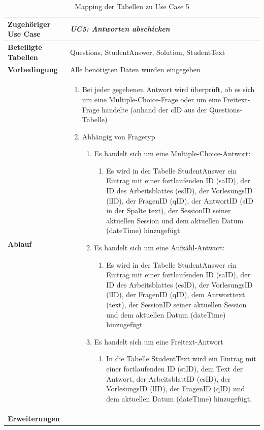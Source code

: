 \begin{table}[h]
	\begin{tabular}{|p{3cm}|p{11.06cm}|}
	\hline
		\textbf{Zugehöriger Use Case}                 &     \emph{UC5: Antworten abschicken} \prettyref{uc:UC5}    \\ \hline
		\textbf{Beteiligte Tabellen}      &     Questions, StudentAnswer, Solution, StudentText    \\ \hline
		\textbf{Vorbedingung}              &    Alle benötigten Daten wurden eingegeben     \\ \hline
		\textbf{Ablauf}              &   
			\begin{enumerate}
			  \item Bei jeder gegebenen Antwort wird überprüft, ob es sich um eine Multiple-Choice-Frage oder um eine Freitext-Frage handelte (anhand der cID aus der Questions-Tabelle)
			  \item Abhängig von Fragetyp
			  \begin{enumerate}
			    \item Es handelt sich um eine Multiple-Choice-Antwort:
			    	\begin{enumerate}
					    \item Es wird in der Tabelle StudentAnswer ein Eintrag mit einer fortlaufenden ID (saID), der ID des Arbeitsblattes (esID), der VorlesungsID (lID), der FragenID (qID), der AntwortID (sID in der Spalte text), der SessionID seiner aktuellen Session und dem aktuellen Datum (dateTime) hinzugefügt
			  		\end{enumerate}
			  	\item Es handelt sich um eine Aufzähl-Antwort:
			    	\begin{enumerate}
					    \item Es wird in der Tabelle StudentAnswer ein Eintrag mit einer fortlaufenden ID (saID), der ID des Arbeitsblattes (esID), der VorlesungsID (lID), der FragenID (qID), dem Antworttext (text), der SessionID seiner aktuellen Session und dem aktuellen Datum (dateTime) hinzugefügt
			  		\end{enumerate}
			    \item Es handelt sich um eine Freitext-Antwort
				    \begin{enumerate}
					    \item In die Tabelle StudentText wird ein Eintrag mit einer fortlaufenden ID (stID), dem Text der Antwort, der ArbeitsblattID (esID), der VorlesungsID (lID), der FragenID (qID) und dem aktuellen Datum (dateTime) hinzugefügt.
				 	 \end{enumerate}
			  \end{enumerate}
			\end{enumerate}
		\\ \hline
		\textbf{Erweiterungen}              &         \\ \hline
	\end{tabular}
	\caption{Mapping der Tabellen zu Use Case 5}
\end{table}\FloatBarrier

